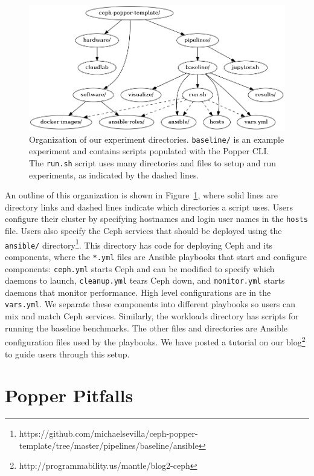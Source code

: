 \begin{figure}[tb] 
  \centering
  \includegraphics[width=1\linewidth]{./figures/expdir.png}
  \caption{Organization of our experiment directories. \texttt{baseline/} is an
example experiment and contains scripts populated with the Popper CLI. The
\texttt{run.sh} script uses many directories and files to setup and run
experiments, as indicated by the dashed lines.}
  \label{fig:expdir}
\end{figure}

An outline of this organization is shown in Figure~\ref{fig:expdir}, where
solid lines are directory links and dashed lines indicate which directories a
script uses.  Users configure their cluster by specifying hostnames and login
user names in the \texttt{hosts} file.  Users also specify the Ceph services
that should be deployed using the \texttt{ansible/}
directory\footnote{https://github.com/michaelsevilla/ceph-popper-template/tree/master/pipelines/baseline/ansible}.
This directory has code for deploying Ceph and its components, where the
\texttt{*.yml} files are Ansible playbooks that start and configure components:
\texttt{ceph.yml} starts Ceph and can be modified to specify which daemons to
launch, \texttt{cleanup.yml} tears Ceph down, and \texttt{monitor.yml} starts
daemons that monitor performance.  High level configurations are in the
\texttt{vars.yml}.  We separate these components into different playbooks so
users can mix and match Ceph services.  Similarly, the workloads directory has
scripts for running the baseline benchmarks. The other files and directories
are Ansible configuration files used by the playbooks. We have posted a
tutorial on our blog\footnote{http://programmability.us/mantle/blog2-ceph} to
guide users through this setup.

\section{Popper Pitfalls}
\label{popper-best-practices}

